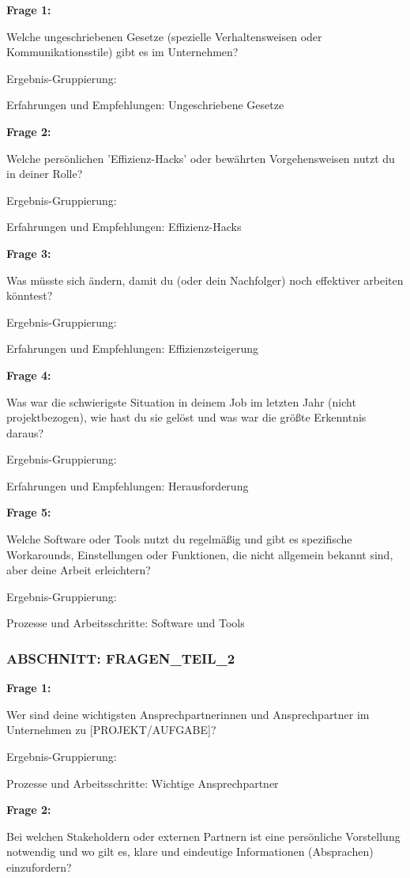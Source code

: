 \documentclass[
  10pt,
  ngerman,
  a4paper,
  toc=graduated,
  numbers=noenddot,
  headings=standardclasses,
  nonumberlist
]{scrartcl}
\begin{document}
\textbf{Frage 1:}

Welche ungeschriebenen Gesetze (spezielle Verhaltensweisen oder Kommunikationsstile) gibt es im Unternehmen?

Ergebnis-Gruppierung:

Erfahrungen und Empfehlungen: Ungeschriebene Gesetze

\textbf{Frage 2:}

Welche persönlichen 'Effizienz-Hacks' oder bewährten Vorgehensweisen nutzt du in deiner Rolle?

Ergebnis-Gruppierung:

Erfahrungen und Empfehlungen: Effizienz-Hacks

\textbf{Frage 3:}

Was müsste sich ändern, damit du (oder dein Nachfolger) noch effektiver arbeiten könntest?

Ergebnis-Gruppierung:

Erfahrungen und Empfehlungen: Effizienzsteigerung

\textbf{Frage 4:}

Was war die schwierigste Situation in deinem Job im letzten Jahr (nicht projektbezogen), wie hast du sie gelöst und was war die größte Erkenntnis daraus?

Ergebnis-Gruppierung:

Erfahrungen und Empfehlungen: Herausforderung

\textbf{Frage 5:}

Welche Software oder Tools nutzt du regelmäßig und gibt es spezifische Workarounds, Einstellungen oder Funktionen, die nicht allgemein bekannt sind, aber deine Arbeit erleichtern?

Ergebnis-Gruppierung:

Prozesse und Arbeitsschritte: Software und Tools

\subsubsection*{ABSCHNITT: FRAGEN\_TEIL\_2}

\textbf{Frage 1:}

Wer sind deine wichtigsten Ansprechpartnerinnen und Ansprechpartner im Unternehmen zu [PROJEKT/\allowbreak AUFGABE]?

Ergebnis-Gruppierung:

Prozesse und Arbeitsschritte: Wichtige Ansprechpartner

\textbf{Frage 2:}

Bei welchen Stakeholdern oder externen Partnern ist eine persönliche Vorstellung notwendig und wo gilt es, klare und eindeutige Informationen (Absprachen) einzufordern?
\end{document}
